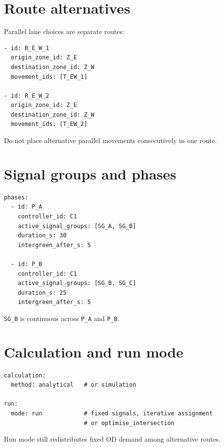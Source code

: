 \section{Route alternatives}
Parallel lane choices are separate routes:
\begin{verbatim}
- id: R_E_W_1
  origin_zone_id: Z_E
  destination_zone_id: Z_W
  movement_ids: [T_EW_1]

- id: R_E_W_2
  origin_zone_id: Z_E
  destination_zone_id: Z_W
  movement_ids: [T_EW_2]
\end{verbatim}
Do not place alternative parallel movements consecutively in one route.

\section{Signal groups and phases}
\begin{verbatim}
phases:
  - id: P_A
    controller_id: C1
    active_signal_groups: [SG_A, SG_B]
    duration_s: 30
    intergreen_after_s: 5

  - id: P_B
    controller_id: C1
    active_signal_groups: [SG_B, SG_C]
    duration_s: 25
    intergreen_after_s: 5
\end{verbatim}
\texttt{SG\_B} is continuous across \texttt{P\_A} and \texttt{P\_B}.

\section{Calculation and run mode}
\begin{verbatim}
calculation:
  method: analytical   # or simulation

run:
  mode: run            # fixed signals, iterative assignment
                       # or optimise_intersection
\end{verbatim}
Run mode still redistributes fixed OD demand among alternative routes.
